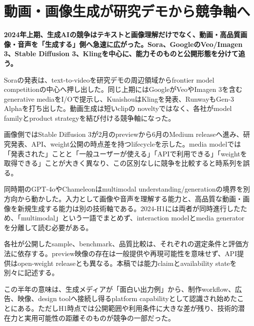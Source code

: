 \section{動画・画像生成が研究デモから競争軸へ}
\label{pkg:generative-media}
\noindent\textbf{2024年上期、生成AIの競争はテキストと画像理解だけでなく、動画・高品質画像・音声を「生成する」側へ急速に広がった。Sora、GoogleのVeo/Imagen 3、Stable Diffusion 3、Klingを中心に、能力そのものと公開形態を分けて追う。}\autocite{src-0f33134a9129,src-0fe343211040,src-7b3484ead314,src-9c32b95d27a7}

Soraの発表は、text-to-videoを研究デモの周辺領域からfrontier model competitionの中心へ押し出した。同じ上期にはGoogleがVeoやImagen 3を含むgenerative mediaをI/Oで提示し、KuaishouはKlingを発表、RunwayもGen-3 Alphaを打ち出した。動画生成は短いclipの noveltyではなく、各社がmodel familyとproduct strategyを結び付ける競争軸になった。\autocite{src-0f33134a9129,src-0fe343211040,src-9c32b95d27a7,src-b881d1321d94}


画像側ではStable Diffusion 3が2月のpreviewから6月のMedium releaseへ進み、研究発表、API、weight公開の時点差を持つlifecycleを示した。media modelでは「発表された」ことと「一般ユーザーが使える」「APIで利用できる」「weightを取得できる」ことが大きく異なり、この区別なしに競争を比較すると時系列を誤る。\autocite{src-7b3484ead314}


同時期のGPT-4oやChameleonはmultimodal understanding/generationの境界を別方向から動かした。入力として画像や音声を理解する能力と、高品質な動画・画像を新規生成する能力は別の技術軸である。2024-H1には両者が同時進行したため、「multimodal」という一語でまとめず、interaction modelとmedia generatorを分離して読む必要がある。\autocite{src-0f33134a9129,src-0fe343211040,src-2d3a533e91db,src-e1259b3c0804}


\begin{claimboundary}
各社が公開したsample、benchmark、品質比較は、それぞれの選定条件と評価方法に依存する。preview映像の存在は一般提供や再現可能性を意味せず、API提供はopen-weight releaseとも異なる。本稿では能力claimとavailability stateを別々に記述する。\autocite{src-0f33134a9129,src-0fe343211040,src-36cdd427b766,src-7b3484ead314,src-9c32b95d27a7}
\end{claimboundary}

この半年の意味は、生成メディアが「面白い出力例」から、制作workflow、広告、映像、design toolへ接続し得るplatform capabilityとして認識され始めたことにある。ただしH1時点では公開範囲や利用条件に大きな差が残り、技術的潜在力と実用可能性の距離そのものが競争の一部だった。\autocite{src-0f33134a9129,src-0fe343211040,src-7b3484ead314,src-9c32b95d27a7,src-b881d1321d94}
